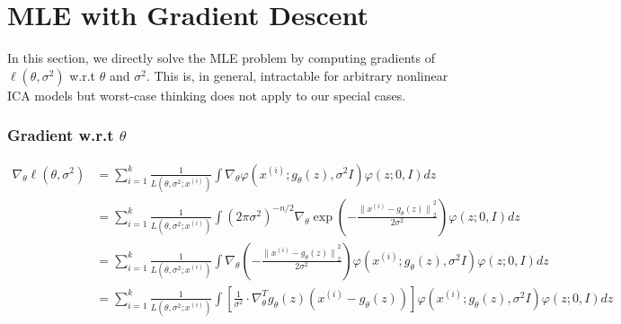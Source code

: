 \section{MLE with Gradient Descent}
In this section, we directly solve the MLE problem by computing gradients of $\ell(\theta, \sigma^{2})$ w.r.t $\theta$ and $\sigma^{2}$. This is, in general, intractable for arbitrary nonlinear ICA models but worst-case thinking does not apply to our special cases.

\subsubsection*{Gradient w.r.t $\theta$}
\begin{equation*}
\begin{aligned}
\nabla_{\theta} \ell(\theta, \sigma^{2}) &= \sum_{i=1}^{k} \frac{1}{L \left(\theta, \sigma^{2}; x^{(i)} \right)} \int \nabla_{\theta} \varphi\left(x^{(i)} ; g_{\theta}(z), \sigma^{2} I\right) \varphi(z ; 0, I) dz \\
&= \sum_{i=1}^{k} \frac{1}{L \left(\theta, \sigma^{2}; x^{(i)} \right)} \int \left(2\pi\sigma^{2}\right)^{-n/2} \nabla_{\theta} \exp \left(-\frac{{\lVert x^{(i)} - g_{\theta}(z) \rVert}_{2}^{2}}{2\sigma^{2}}\right) \varphi(z ; 0, I) dz \\
&= \sum_{i=1}^{k} \frac{1}{L \left(\theta, \sigma^{2}; x^{(i)} \right)} \int \nabla_{\theta} \left(-\frac{{\lVert x^{(i)} - g_{\theta}(z) \rVert}_{2}^{2}}{2\sigma^{2}}\right) \varphi\left(x^{(i)} ; g_{\theta}(z), \sigma^{2} I\right) \varphi(z ; 0, I) dz \\
&= \sum_{i=1}^{k} \frac{1}{L \left(\theta, \sigma^{2}; x^{(i)} \right)} \int \left[\frac{1}{\sigma^{2}} \cdot{\nabla_{\theta}^{T} g_{\theta}(z) \left(x^{(i)} - g_{\theta}(z)\right) }\right] \varphi\left(x^{(i)} ; g_{\theta}(z), \sigma^{2} I\right) \varphi(z ; 0, I) dz \\
\end{aligned}
\end{equation*}

